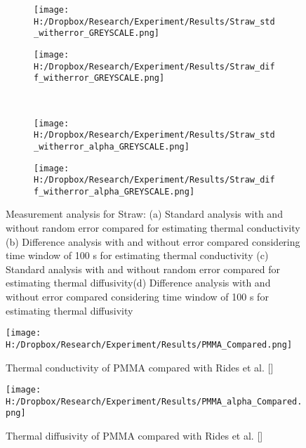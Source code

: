 \documentclass[12pt]{report}
\begin{document}
\begin{figure}
\begin{subfigure}{.5\textwidth}
\centering
\texttt{[image: H:/Dropbox/Research/Experiment/Results/Straw\_std\_witherror\_GREYSCALE.png]}
\caption{}
\end{subfigure}\hfill
\begin{subfigure}{.5\textwidth}
\centering
\texttt{[image: H:/Dropbox/Research/Experiment/Results/Straw\_diff\_witherror\_GREYSCALE.png]}
\caption{}
\end{subfigure}\\
\begin{subfigure}{.5\textwidth}
\centering
\texttt{[image: H:/Dropbox/Research/Experiment/Results/Straw\_std\_witherror\_alpha\_GREYSCALE.png]}
\caption{}
\end{subfigure}\hfill
\begin{subfigure}{.5\textwidth}
\centering
\texttt{[image: H:/Dropbox/Research/Experiment/Results/Straw\_diff\_witherror\_alpha\_GREYSCALE.png]}
\caption{}
\end{subfigure}
\caption{Measurement analysis for Straw: (a) Standard analysis with and without random error compared for estimating thermal conductivity (b) Difference analysis with and without error compared considering time window of 100 s for estimating thermal conductivity (c) Standard analysis with and without random error compared for estimating thermal diffusivity(d) Difference analysis with and without error compared considering time window of 100 s for estimating thermal diffusivity}
\label{pic:straw2}
\end{figure}



\begin{figure}
\centering
\texttt{[image: H:/Dropbox/Research/Experiment/Results/PMMA\_Compared.png]}
\caption{Thermal conductivity of PMMA compared with Rides et al. []}
\label{pic:pmmak}
\end{figure}


\begin{figure}
\centering
\texttt{[image: H:/Dropbox/Research/Experiment/Results/PMMA\_alpha\_Compared.png]}
\caption{Thermal diffusivity of PMMA compared with Rides et al. []}
\label{pic:pmmaalpha}
\end{figure}
\end{document}
